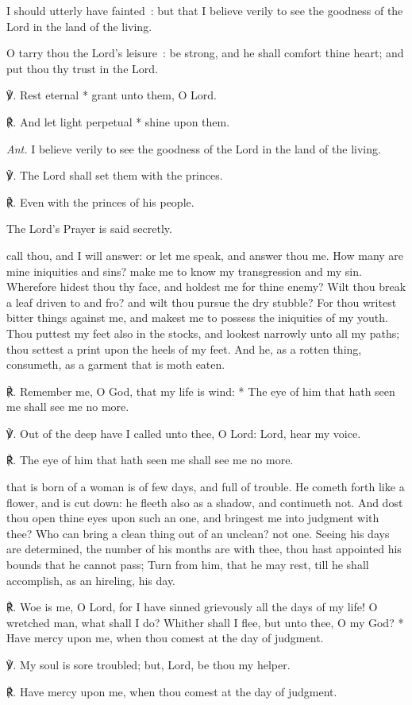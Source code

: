 I should utterly have fainted~: but that I believe verily to see the goodness of the Lord in the land of the living.\par
{}O tarry thou the Lord's leisure~: be strong, and he shall comfort thine heart; and put thou thy trust in the Lord.\par
℣. Rest eternal * grant unto them, O Lord.\par
℟. And let light perpetual * shine upon them.\par\noindent
\textit{Ant.} I believe verily to see the goodness of the Lord in the land of the living.\par
\vspace{0.5\baselineskip}
℣. The Lord shall set them with the princes.\par
℟. Even with the princes of his people.\par
\begin{rubric}
    {The Lord's Prayer is said secretly.}
\end{rubric}
 call thou, and I will answer: or let me speak, and answer thou me. How many are mine iniquities and sins? make me to know my transgression and my sin. Wherefore hidest thou thy face, and holdest me for thine enemy? Wilt thou break a leaf driven to and fro? and wilt thou pursue the dry stubble? For thou writest bitter things against me, and makest me to possess the iniquities of my youth. Thou puttest my feet also in the stocks, and lookest narrowly unto all my paths; thou settest a print upon the heels of my feet. And he, as a rotten thing, consumeth, as a garment that is moth eaten.\par
℟. Remember me, {\dag} O God, that my life is wind: * The eye of him that hath seen me shall see me no more.\par
℣. Out of the deep have I called unto thee, O Lord: Lord, hear my voice.\par
℟. The eye of him that hath seen me shall see me no more.

 that is born of a woman is of few days, and full of trouble. He cometh forth like a flower, and is cut down: he fleeth also as a shadow, and continueth not. And dost thou open thine eyes upon such an one, and bringest me into judgment with thee? Who can bring a clean thing out of an unclean? not one. Seeing his days are determined, the number of his months are with thee, thou hast appointed his bounds that he cannot pass; Turn from him, that he may rest, till he shall accomplish, as an hireling, his day.\par
℟. Woe is me, {\dag} O Lord, for I have sinned grievously all the days of my life! O wretched man, what shall I do? Whither shall I flee, but unto thee, O my God? * Have mercy upon me, when thou comest at the day of judgment.\par
℣. My soul is sore troubled; but, Lord, be thou my helper.\par
℟. Have mercy upon me, when thou comest at the day of judgment.

